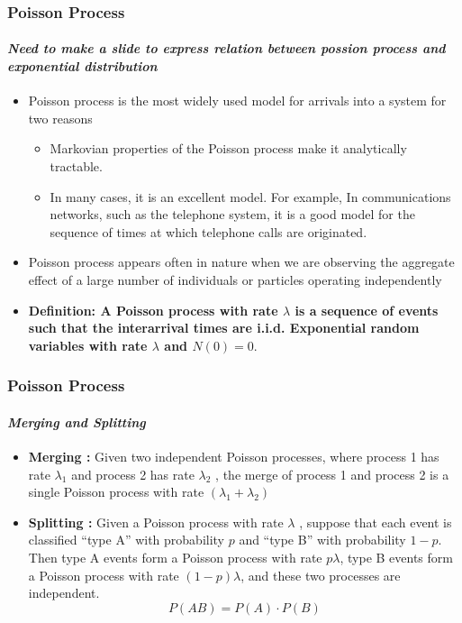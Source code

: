 \documentclass{beamer}
\begin{document}
\begin{frame} 
\frametitle{Poisson Process}
\framesubtitle{\textbf{\textit{Need to make a slide to express relation between possion process and exponential distribution}}}
\begin{itemize}
\item Poisson process is the most widely used model for arrivals into a system for two reasons
\begin{itemize}
\item Markovian properties of the Poisson process make it analytically tractable.
\item In many cases, it is an excellent model. For example, In communications networks, such as the telephone system, it is a good model
for the sequence of times at which telephone calls are originated.
\end{itemize}

\item  Poisson process appears often in nature when we are observing the aggregate effect of a large number of individuals or particles operating independently

\item \textbf{Definition:
A Poisson process with rate $\lambda$ is a sequence of events such that the interarrival
times are i.i.d. Exponential random variables with rate $\lambda$ and $N (0) = 0$}.

\end{itemize}
	
\end{frame}


\begin{frame} 
\frametitle{Poisson Process}
\framesubtitle{\textbf{\textit{Merging and Splitting}}}
\begin{itemize}
\item \textbf{Merging :}  Given two independent Poisson processes, where process 1 has rate $\lambda_1$ and process 2 has rate $\lambda_2$ , the merge of process 1 
and process 2 is a single Poisson process with rate $(\lambda_1+\lambda_2)$
\item \textbf{Splitting :}  Given a Poisson process with rate $\lambda$ , suppose that each event is
classified ``type A'' with probability $p$ and ``type B'' with probability 
$1-p$. Then
type A events form a Poisson process with rate $p \lambda$, type B events form a Poisson
process with rate $(1-p)\lambda$, and these two processes are independent. $$P(AB) = P(A) \cdot P(B)$$
\end{itemize}
	
\end{frame}

   
\end{document}
